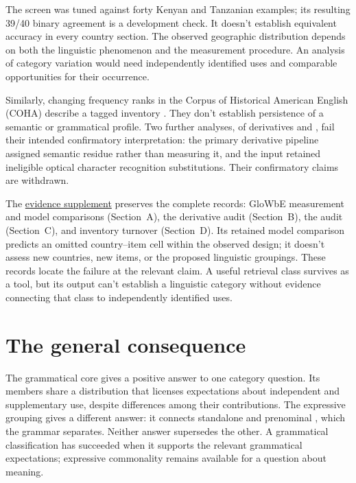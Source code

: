 \documentclass[12pt]{article}
\begin{document}
The screen was tuned against forty Kenyan and Tanzanian examples;
its resulting 39/40 binary agreement is a development check. It doesn't
establish equivalent accuracy in every country section. The observed
geographic distribution depends on both the linguistic
phenomenon and the measurement procedure. An analysis of category
variation would need independently identified uses and comparable
opportunities for their occurrence.

Similarly, changing frequency ranks in the Corpus of Historical American
English (COHA) describe a tagged inventory \citep{davies2010}.
They don't establish persistence of a semantic or grammatical profile.
Two further analyses, of derivatives and , fail their
intended confirmatory interpretation: the primary derivative pipeline
assigned semantic residue rather than measuring it, and the 
input retained ineligible optical character recognition substitutions.
Their confirmatory claims are withdrawn.

The \href{inquiry-relative-evidence-supplement.pdf}{evidence supplement}
preserves the complete records: GloWbE measurement and model comparisons
(Section~A), the derivative audit (Section~B), the  audit
(Section~C), and inventory turnover (Section~D). Its retained model
comparison predicts an omitted country--item cell within the observed
design; it doesn't assess new countries, new items, or the proposed
linguistic groupings. These records locate
the failure at the relevant claim. A useful retrieval class survives
as a tool, but its output can't establish a linguistic category
without evidence connecting that class to independently identified uses.

\section{The general consequence}\label{sec:discussion}

The grammatical core gives a positive answer to one category question.
Its members share a distribution that licenses expectations about independent
and supplementary use, despite differences among their contributions.
The expressive grouping gives a different answer: it connects standalone
and prenominal , which the grammar separates. Neither answer
supersedes the other. A grammatical classification has succeeded when
it supports the relevant grammatical expectations; expressive commonality
remains available for a question about meaning.
\end{document}
